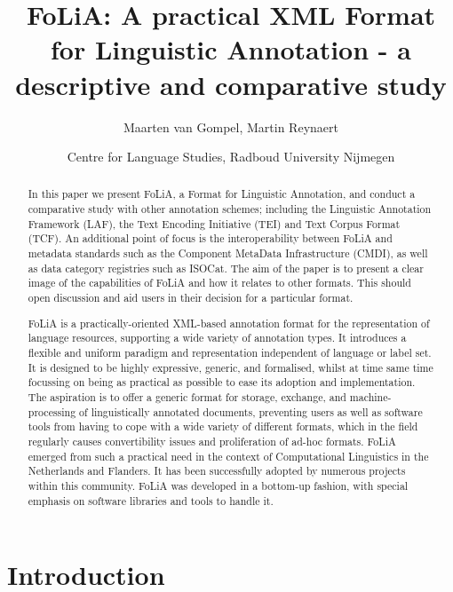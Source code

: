 \documentclass[a4paper,10pt,twoside]{article}
\begin{document}
\title{FoLiA: A practical XML Format for Linguistic Annotation - a descriptive and comparative study}
\author{Maarten van Gompel, Martin Reynaert}

\date{Centre for Language Studies, Radboud University Nijmegen}


\maketitle

\begin{abstract}

In this paper we present FoLiA, a Format for Linguistic Annotation, and conduct
a comparative study with other annotation schemes; including the Linguistic Annotation Framework (LAF), the Text Encoding Initiative (TEI) and Text Corpus Format (TCF). An additional point of focus is the interoperability between FoLiA and metadata standards such as the Component MetaData Infrastructure (CMDI), as well as data category registries such as
ISOCat. The aim of the paper is to present a clear image of the capabilities of
FoLiA and how it relates to other formats. This should open discussion and aid
users in their decision for a particular format.

FoLiA is a practically-oriented XML-based annotation format for the
representation of language resources, supporting a wide variety of annotation
types. It introduces a flexible and uniform paradigm and representation
independent of language or label set. It is designed to be highly expressive,
generic, and formalised, whilst at time same time focussing on being as
practical as possible to ease its adoption and implementation. The aspiration
is to offer a generic format for storage, exchange, and machine-processing of
linguistically annotated documents, preventing users as well as software tools
from having to cope with a wide variety of different formats, which in the
field regularly causes convertibility issues and proliferation of ad-hoc
formats. FoLiA emerged from such a practical need in the context of
Computational Linguistics in the Netherlands and Flanders. It has been
successfully adopted by numerous projects within this community. FoLiA was
developed in a bottom-up fashion, with special emphasis on software libraries
and tools to handle it.

\end{abstract}

\section{Introduction}
\end{document}
